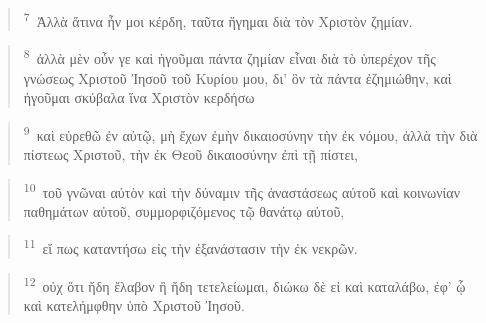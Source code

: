 \documentclass{article}
\newcommand{\currentverse}{1} %
\newcommand{\setcurrentverse}[1]{\renewcommand{\currentverse}{#1}}
\begin{document}
\begin{verse}

\setcurrentverse{7}

\setcounter{footnote}{0}

\textsuperscript{7}~Ἀλλὰ ἅτινα ἦν μοι κέρδη, ταῦτα ἥγημαι διὰ τὸν Χριστὸν ζημίαν.

\end{verse}

\begin{verse}

\setcurrentverse{8}

\setcounter{footnote}{0}

\textsuperscript{8}~ἀλλὰ μὲν οὖν γε καὶ ἡγοῦμαι πάντα ζημίαν εἶναι διὰ τὸ ὑπερέχον τῆς γνώσεως Χριστοῦ Ἰησοῦ τοῦ Κυρίου μου, δι’ ὃν τὰ πάντα ἐζημιώθην, καὶ ἡγοῦμαι σκύβαλα ἵνα Χριστὸν κερδήσω

\end{verse}

\begin{verse}

\setcurrentverse{9}

\setcounter{footnote}{0}

\textsuperscript{9}~καὶ εὑρεθῶ ἐν αὐτῷ, μὴ ἔχων ἐμὴν δικαιοσύνην τὴν ἐκ νόμου, ἀλλὰ τὴν διὰ πίστεως Χριστοῦ, τὴν ἐκ Θεοῦ δικαιοσύνην ἐπὶ τῇ πίστει,

\end{verse}

\begin{verse}

\setcurrentverse{10}

\setcounter{footnote}{0}

\textsuperscript{10}~τοῦ γνῶναι αὐτὸν καὶ τὴν δύναμιν τῆς ἀναστάσεως αὐτοῦ καὶ κοινωνίαν παθημάτων αὐτοῦ, συμμορφιζόμενος τῷ θανάτῳ αὐτοῦ,

\end{verse}

\begin{verse}

\setcurrentverse{11}

\setcounter{footnote}{0}

\textsuperscript{11}~εἴ πως καταντήσω εἰς τὴν ἐξανάστασιν τὴν ἐκ νεκρῶν.

\end{verse}

\begin{verse}

\setcurrentverse{12}

\setcounter{footnote}{0}

\textsuperscript{12}~οὐχ ὅτι ἤδη ἔλαβον ἢ ἤδη τετελείωμαι, διώκω δὲ εἰ καὶ καταλάβω, ἐφ’ ᾧ καὶ κατελήμφθην ὑπὸ Χριστοῦ Ἰησοῦ.

\end{verse}
\end{document}

